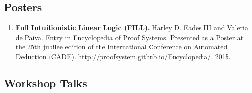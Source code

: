 \documentclass{article}
\begin{document}
  \subsection{Posters}
  \label{subsec:posters}
  \begin{enumerate}
  \item \textbf{Full Intuitionistic Linear Logic (FILL).} Harley D. Eades
    III and Valeria de Paiva. Entry in Encyclopedia of Proof
    Systems. Presented as a Poster at the 25th jubilee edition of the
    International Conference on Automated Deduction (CADE). \url{http://proofsystem.github.io/Encyclopedia/}. 2015.
  \end{enumerate}

  \subsection{Workshop Talks}
\end{document}
